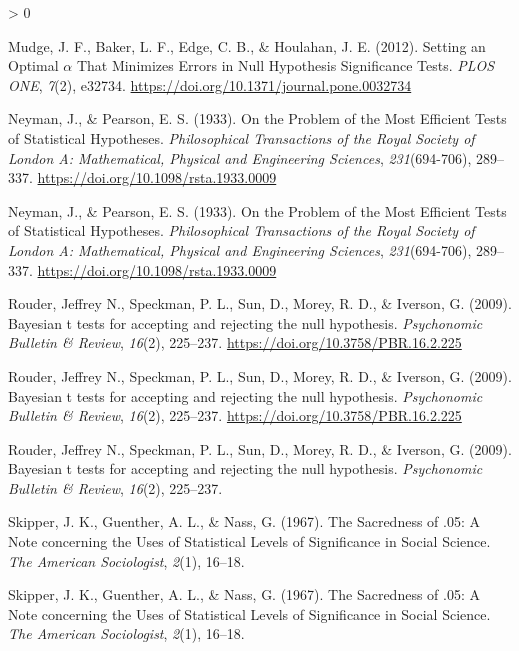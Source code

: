 \documentclass[
  english,
  ,jou, a4paper,floatsintext]{apa6}
\newlength{\cslhangindent}
\newenvironment{CSLReferences}[2] %
 {%
  \setlength{\parindent}{0pt}
  \ifodd #1 \everypar{\setlength{\hangindent}{\cslhangindent}}\ignorespaces\fi
  \ifnum #2 > 0
  \setlength{\parskip}{#2\baselineskip}
  \fi
 }%
 {}
\begin{document}
\begin{CSLReferences}{1}{0}
\leavevmode\hypertarget{ref-mudge_setting_2012}{}%
Mudge, J. F., Baker, L. F., Edge, C. B., \& Houlahan, J. E. (2012). Setting an {Optimal} {\(\alpha\)} {That Minimizes Errors} in {Null Hypothesis Significance Tests}. \emph{PLOS ONE}, \emph{7}(2), e32734. \url{https://doi.org/10.1371/journal.pone.0032734}

\leavevmode\hypertarget{ref-neyman_problem_1933}{}%
Neyman, J., \& Pearson, E. S. (1933). On the {Problem} of the {Most Efficient Tests} of {Statistical Hypotheses}. \emph{Philosophical Transactions of the Royal Society of London A: Mathematical, Physical and Engineering Sciences}, \emph{231}(694-706), 289--337. \url{https://doi.org/10.1098/rsta.1933.0009}

\leavevmode\hypertarget{ref-neyman_problem_1933}{}%
Neyman, J., \& Pearson, E. S. (1933). On the {Problem} of the {Most Efficient Tests} of {Statistical Hypotheses}. \emph{Philosophical Transactions of the Royal Society of London A: Mathematical, Physical and Engineering Sciences}, \emph{231}(694-706), 289--337. \url{https://doi.org/10.1098/rsta.1933.0009}

\leavevmode\hypertarget{ref-rouder_bayesian_2009}{}%
Rouder, Jeffrey N., Speckman, P. L., Sun, D., Morey, R. D., \& Iverson, G. (2009). Bayesian t tests for accepting and rejecting the null hypothesis. \emph{Psychonomic Bulletin \& Review}, \emph{16}(2), 225--237. \url{https://doi.org/10.3758/PBR.16.2.225}

\leavevmode\hypertarget{ref-rouder_bayesian_2009}{}%
Rouder, Jeffrey N., Speckman, P. L., Sun, D., Morey, R. D., \& Iverson, G. (2009). Bayesian t tests for accepting and rejecting the null hypothesis. \emph{Psychonomic Bulletin \& Review}, \emph{16}(2), 225--237. \url{https://doi.org/10.3758/PBR.16.2.225}

\leavevmode\hypertarget{ref-rouder2009bayesian}{}%
Rouder, Jeffrey N., Speckman, P. L., Sun, D., Morey, R. D., \& Iverson, G. (2009). Bayesian t tests for accepting and rejecting the null hypothesis. \emph{Psychonomic Bulletin \& Review}, \emph{16}(2), 225--237.

\leavevmode\hypertarget{ref-skipper_sacredness_1967}{}%
Skipper, J. K., Guenther, A. L., \& Nass, G. (1967). The {Sacredness} of .05: {A Note} concerning the {Uses} of {Statistical Levels} of {Significance} in {Social Science}. \emph{The American Sociologist}, \emph{2}(1), 16--18.

\leavevmode\hypertarget{ref-skipper_sacredness_1967}{}%
Skipper, J. K., Guenther, A. L., \& Nass, G. (1967). The {Sacredness} of .05: {A Note} concerning the {Uses} of {Statistical Levels} of {Significance} in {Social Science}. \emph{The American Sociologist}, \emph{2}(1), 16--18.


\end{CSLReferences}
\end{document}
